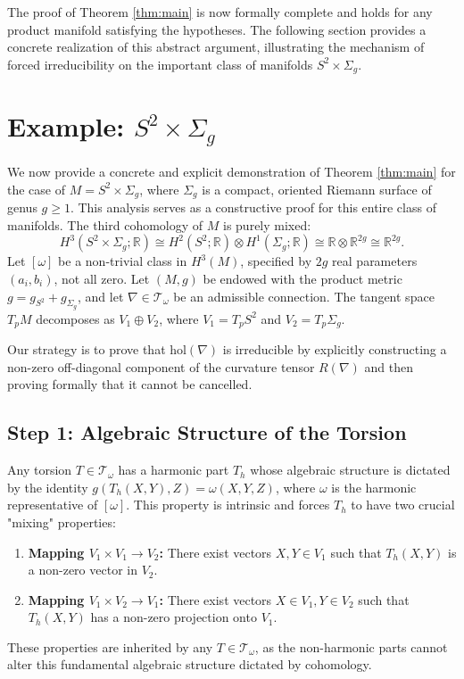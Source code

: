 \documentclass[12pt]{article}
\begin{document}
The proof of Theorem \ref{thm:main} is now formally complete and holds for any product manifold satisfying the hypotheses. The following section provides a concrete realization of this abstract argument, illustrating the mechanism of forced irreducibility on the important class of manifolds $S^2 \times \Sigma_g$.

\section{Example: $S^2 \times \Sigma_g$}

We now provide a concrete and explicit demonstration of Theorem \ref{thm:main} for the case of $M = S^2 \times \Sigma_g$, where $\Sigma_g$ is a compact, oriented Riemann surface of genus $g \geq 1$. This analysis serves as a constructive proof for this entire class of manifolds. The third cohomology of $M$ is purely mixed:
\[H^3(S^2 \times \Sigma_g; \mathbb{R}) \cong H^2(S^2; \mathbb{R}) \otimes H^1(\Sigma_g; \mathbb{R}) \cong \mathbb{R} \otimes \mathbb{R}^{2g} \cong \mathbb{R}^{2g}.\]
Let $[\omega]$ be a non-trivial class in $H^3(M)$, specified by $2g$ real parameters $(a_i, b_i)$, not all zero. Let $(M, g)$ be endowed with the product metric $g = g_{S^2} + g_{\Sigma_g}$, and let $\nabla \in \mathcal{T}_\omega$ be an admissible connection. The tangent space $T_pM$ decomposes as $V_1 \oplus V_2$, where $V_1 = T_pS^2$ and $V_2 = T_p\Sigma_g$.

Our strategy is to prove that $\mathrm{hol}(\nabla)$ is irreducible by explicitly constructing a non-zero off-diagonal component of the curvature tensor $R(\nabla)$ and then proving formally that it cannot be cancelled.

\subsection{Step 1: Algebraic Structure of the Torsion}
Any torsion $T \in \mathcal{T}_\omega$ has a harmonic part $T_h$ whose algebraic structure is dictated by the identity $g(T_h(X,Y),Z) = \omega(X,Y,Z)$, where $\omega$ is the harmonic representative of $[\omega]$. This property is intrinsic and forces $T_h$ to have two crucial "mixing" properties:
\begin{enumerate}
    \item \textbf{Mapping $V_1 \times V_1 \to V_2$:} There exist vectors $X,Y \in V_1$ such that $T_h(X,Y)$ is a non-zero vector in $V_2$.
    \item \textbf{Mapping $V_1 \times V_2 \to V_1$:} There exist vectors $X \in V_1, Y \in V_2$ such that $T_h(X,Y)$ has a non-zero projection onto $V_1$.
\end{enumerate}
These properties are inherited by any $T \in \mathcal{T}_\omega$, as the non-harmonic parts cannot alter this fundamental algebraic structure dictated by cohomology.
\end{document}
